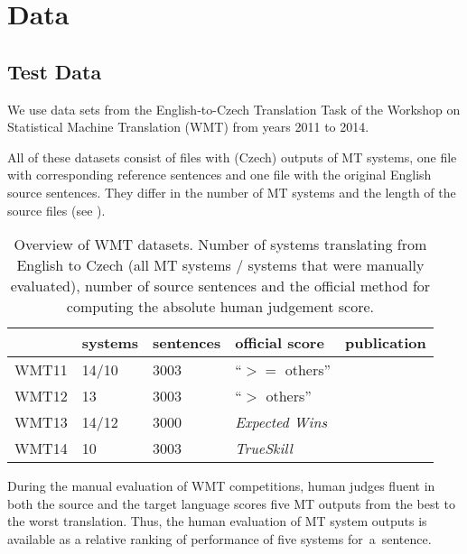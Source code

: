\chapter{Data}

\section{Test Data}

We use data sets from the English-to-Czech Translation Task of the Workshop on
Statistical Machine Translation (WMT) from years 2011 to 2014.

All of these datasets consist of files with (Czech) outputs of MT systems, one
file with corresponding reference sentences and one file with the original
English source sentences. They differ in the number of MT systems and the 
length of the source files (see ). 


\begin{table}[h]
\centering
\begin{tabular}{l|l|l|l|l}
      & systems & sentences & official score & publication\\
\hline
WMT11 & 14/10    & 3003      & “$ >= $ others”      & \cite{wmt11}  \\
WMT12 & 13          & 3003      & “$ > $ others”      & \cite{wmt12}  \\
WMT13 & 14/12    & 3000      & \textit{Expected Wins} & \cite{wmt13}  \\
WMT14 & 10          & 3003      & \textit{TrueSkill}   & \cite{wmt14}
\end{tabular}
\caption{Overview of WMT datasets. Number of systems translating from English 
to Czech (all MT systems / systems that were manually evaluated), number of 
source sentences and the official method for computing the absolute human 
judgement score.}
\label{wmt-data}
\end{table}

During the manual evaluation of WMT competitions, human judges fluent in both
the source and the target language scores five MT outputs from the best to
the worst translation. Thus, the human evaluation of MT system outputs is
available as a relative ranking of performance of five systems for~a~sentence. 

